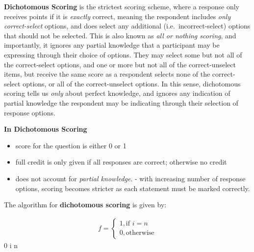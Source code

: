 \documentclass[
  letterpaper,
  DIV=11,
  numbers=noendperiod]{scrreprt}
\providecommand{\tightlist}{%
  \setlength{\itemsep}{0pt}\setlength{\parskip}{0pt}}\usepackage{longtable,booktabs,array}
\begin{document}
\textbf{Dichotomous Scoring} is the strictest scoring scheme, where a
response only receives points if it is \emph{exactly} correct, meaning
the respondent includes \emph{only correct-select} options, and does
select any additional (i.e.~incorrect-select) options that should not be
selected. This is also known as \emph{all or nothing scoring}, and
importantly, it ignores any partial knowledge that a participant may be
expressing through their choice of options. They may select some but not
all of the correct-select options, and one or more but not all of the
correct-unselect items, but receive the same score as a respondent
selects none of the correct-select options, or all of the
correct-unselect options. In this sense, dichotomous scoring tells us
\emph{only} about perfect knowledge, and ignores any indication of
partial knowledge the respondent may be indicating through their
selection of response options.

\textbf{In Dichotomous Scoring}

\begin{itemize}
\tightlist
\item
  score for the question is either 0 or 1
\item
  full credit is only given if all responses are correct; otherwise no
  credit
\item
  does not account for \emph{partial knowledge}. - with increasing
  number of response options, scoring becomes stricter as each statement
  must be marked correctly.
\end{itemize}

The algorithm for \textbf{dichotomous scoring} is given by:

\begin{gather*}
f = 
\begin{cases}
  1, \text{if } i = n \\    
  0, \text{otherwise}    
\end{cases}
\end{gather*}  0 \le i \le n
\end{document}
